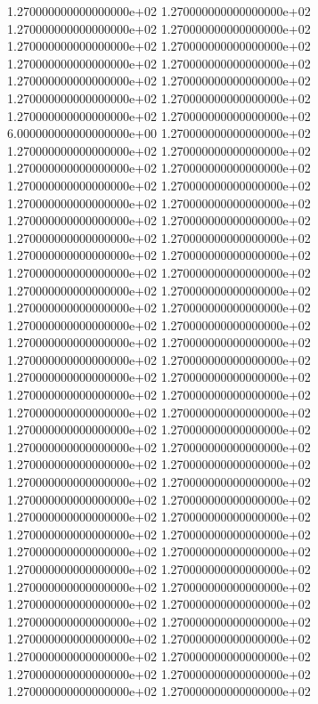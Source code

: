 1.270000000000000000e+02 1.270000000000000000e+02 1.270000000000000000e+02 1.270000000000000000e+02 1.270000000000000000e+02 1.270000000000000000e+02 1.270000000000000000e+02 1.270000000000000000e+02 1.270000000000000000e+02 1.270000000000000000e+02 1.270000000000000000e+02 1.270000000000000000e+02 1.270000000000000000e+02 1.270000000000000000e+02 6.000000000000000000e+00 1.270000000000000000e+02 1.270000000000000000e+02 1.270000000000000000e+02 1.270000000000000000e+02 1.270000000000000000e+02 1.270000000000000000e+02 1.270000000000000000e+02 1.270000000000000000e+02 1.270000000000000000e+02 1.270000000000000000e+02 1.270000000000000000e+02 1.270000000000000000e+02 1.270000000000000000e+02 1.270000000000000000e+02 1.270000000000000000e+02 1.270000000000000000e+02 1.270000000000000000e+02 1.270000000000000000e+02 1.270000000000000000e+02 1.270000000000000000e+02 1.270000000000000000e+02 1.270000000000000000e+02 1.270000000000000000e+02 1.270000000000000000e+02 1.270000000000000000e+02 1.270000000000000000e+02 1.270000000000000000e+02 1.270000000000000000e+02 1.270000000000000000e+02 1.270000000000000000e+02 1.270000000000000000e+02 1.270000000000000000e+02 1.270000000000000000e+02 1.270000000000000000e+02 1.270000000000000000e+02 1.270000000000000000e+02 1.270000000000000000e+02 1.270000000000000000e+02 1.270000000000000000e+02 1.270000000000000000e+02 1.270000000000000000e+02 1.270000000000000000e+02 1.270000000000000000e+02 1.270000000000000000e+02 1.270000000000000000e+02 1.270000000000000000e+02 1.270000000000000000e+02 1.270000000000000000e+02 1.270000000000000000e+02 1.270000000000000000e+02 1.270000000000000000e+02 1.270000000000000000e+02 1.270000000000000000e+02 1.270000000000000000e+02 1.270000000000000000e+02 1.270000000000000000e+02 1.270000000000000000e+02 1.270000000000000000e+02 1.270000000000000000e+02 1.270000000000000000e+02 1.270000000000000000e+02 1.270000000000000000e+02 1.270000000000000000e+02 1.270000000000000000e+02 1.270000000000000000e+02
